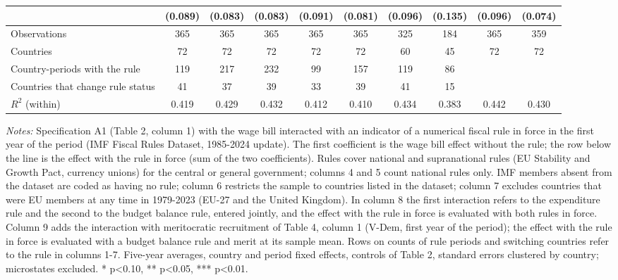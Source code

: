 \begin{table}[htbp]
\begin{tabular}{l*{9}{c}}
 & (0.089) & (0.083) & (0.083) & (0.091) & (0.081) & (0.096) & (0.135) & (0.096) & (0.074) \\
\midrule
Observations & 365 & 365 & 365 & 365 & 365 & 325 & 184 & 365 & 359 \\
Countries & 72 & 72 & 72 & 72 & 72 & 60 & 45 & 72 & 72 \\
Country-periods with the rule & 119 & 217 & 232 & 99 & 157 & 119 & 86 &  &  \\
Countries that change rule status & 41 & 37 & 39 & 33 & 39 & 41 & 15 &  &  \\
$R^2$ (within) & 0.419 & 0.429 & 0.432 & 0.412 & 0.410 & 0.434 & 0.383 & 0.442 & 0.430 \\
\bottomrule
\end{tabular}
\begin{minipage}{0.95\linewidth}\vspace{4pt}\scriptsize \textit{Notes:} Specification A1 (Table 2, column 1) with the wage bill interacted with an indicator of a numerical fiscal rule in force in the first year of the period (IMF Fiscal Rules Dataset, 1985-2024 update). The first coefficient is the wage bill effect without the rule; the row below the line is the effect with the rule in force (sum of the two coefficients). Rules cover national and supranational rules (EU Stability and Growth Pact, currency unions) for the central or general government; columns 4 and 5 count national rules only. IMF members absent from the dataset are coded as having no rule; column 6 restricts the sample to countries listed in the dataset; column 7 excludes countries that were EU members at any time in 1979-2023 (EU-27 and the United Kingdom). In column 8 the first interaction refers to the expenditure rule and the second to the budget balance rule, entered jointly, and the effect with the rule in force is evaluated with both rules in force. Column 9 adds the interaction with meritocratic recruitment of Table 4, column 1 (V-Dem, first year of the period); the effect with the rule in force is evaluated with a budget balance rule and merit at its sample mean. Rows on counts of rule periods and switching countries refer to the rule in columns 1-7. Five-year averages, country and period fixed effects, controls of Table 2, standard errors clustered by country; microstates excluded. * p<0.10, ** p<0.05, *** p<0.01.\end{minipage}
\end{table}
